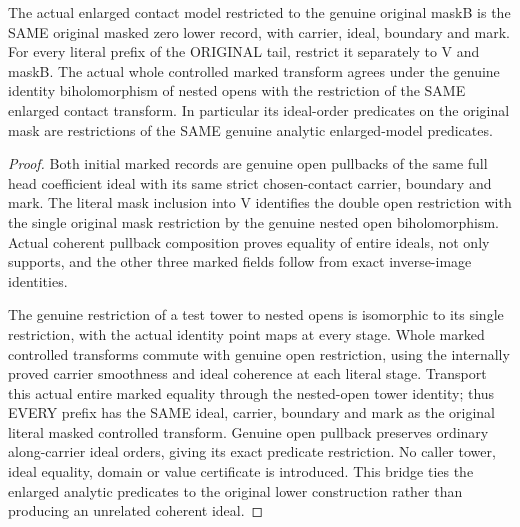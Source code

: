 \begin{theorem}
\label{hir:zero-contact-whole-masked-transform-identity}
The actual enlarged contact model restricted to the genuine original maskB
is the SAME original masked zero lower record, with carrier, ideal, boundary
and mark. For every literal prefix of the ORIGINAL tail, restrict it separately to V and maskB. The actual whole controlled
marked transform agrees under the genuine identity biholomorphism of nested
opens with the restriction of the SAME enlarged contact transform. In
particular its ideal-order predicates on the original mask are restrictions
of the SAME genuine analytic enlarged-model predicates.
\end{theorem}
\leanok
\begin{proof}
Both initial marked records are genuine open pullbacks of the same full
head coefficient ideal with its same strict chosen-contact carrier, boundary
and mark. The literal mask inclusion into V identifies the double open
restriction with the single original mask restriction by the genuine nested
open biholomorphism. Actual coherent pullback composition proves equality
of entire ideals, not only supports, and the other three marked fields follow
from exact inverse-image identities.

The genuine restriction of a test tower to nested opens is isomorphic to
its single restriction, with the actual identity point maps at every stage.
Whole marked controlled transforms commute with genuine open restriction,
using the internally proved carrier smoothness and ideal coherence at each
literal stage. Transport this actual entire marked equality through the
nested-open tower identity; thus EVERY prefix has the SAME ideal, carrier,
boundary and mark as the original literal masked controlled transform.
Genuine open pullback preserves ordinary along-carrier ideal orders, giving
its exact predicate restriction. No caller tower, ideal equality, domain or
value certificate is introduced. This bridge ties the enlarged analytic
predicates to the original lower construction rather than producing an
unrelated coherent ideal.
\end{proof}

